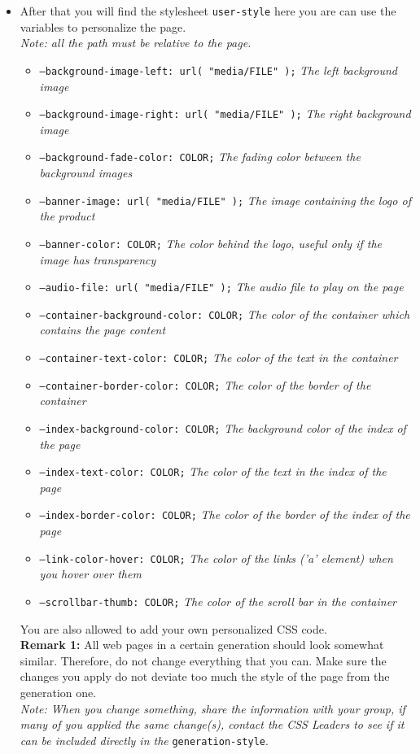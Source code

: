 \documentclass{article}
\begin{document}
\begin{itemize}
    \item After that you will find the stylesheet \colorbox{grey!7}{\texttt{user-style}} here you are can use the variables to personalize the page. \\
    \textit{Note: all the path must be relative to the page.}
    \begin{itemize}
        \item[] \texttt{--background-image-left: url( "media/FILE" );} \textit{The left background image}
        \item[] \texttt{--background-image-right: url( "media/FILE" );} \textit{The right background image}
        \item[] \texttt{--background-fade-color: COLOR;} \textit{The fading color between the background images}
        \item[] \texttt{--banner-image: url( "media/FILE" );} \textit{The image containing the logo of the product}
        \item[] \texttt{--banner-color: COLOR;} \textit{The color behind the logo, useful only if the image has transparency}
        \item[] \texttt{--audio-file: url( "media/FILE" );} \textit{The audio file to play on the page}
        \item[] \texttt{--container-background-color: COLOR;} \textit{The color of the container which contains the page content}
        \item[] \texttt{--container-text-color: COLOR;} \textit{The color of the text in the container}
        \item[] \texttt{--container-border-color: COLOR;} \textit{The color of the border of the container}
        \item[] \texttt{--index-background-color: COLOR;} \textit{The background color of the index of the page}
        \item[] \texttt{--index-text-color: COLOR;} \textit{The color of the text in the index of the page}
        \item[] \texttt{--index-border-color: COLOR;} \textit{The color of the border of the index of the page}
        \item[] \texttt{--link-color-hover: COLOR;} \textit{The color of the links ('a' element) when you hover over them}
        \item[] \texttt{--scrollbar-thumb: COLOR;} \textit{The color of the scroll bar in the container}
    \end{itemize}
    You are also allowed to add your own personalized CSS code. \\
    \textbf{Remark 1:} All web pages in a certain generation should look somewhat similar. Therefore, do not change everything that you can. Make sure the changes you apply do not deviate too much the style of the page from the generation one.\\
    \textit{Note: When you change something, share the information with your group, if many of you applied the same change(s), contact the CSS Leaders to see if it can be included directly in the} \texttt{generation-style}. \\
    

\end{itemize}
\end{document}

